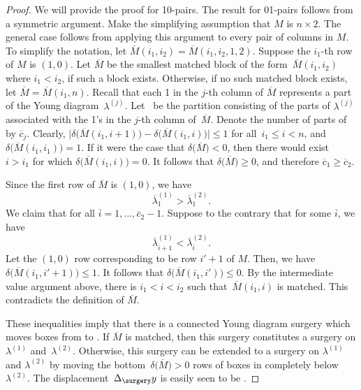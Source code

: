 \begin{proof}
We will provide the proof for 10-pairs. The result for 01-pairs follows from a symmetric argument. Make the simplifying assumption that $M$ is $n\times 2$. The general case follows from applying this argument to every pair of columns in $M$. To simplify the notation, let $\overline{M}(i_1, i_2) = \overline{M}(i_1, i_2, 1, 2)$.
Suppose the $i_1$-th row of $M$ is $(1, 0)$. Let $\overline M$ be the smallest matched block of the form~$\overline{M}(i_1, i_2)$ where $i_1 < i_2$, if such a block exists. Otherwise, if no such matched block exists, let $\overline M = \overline{M}(i_1, n)$. Recall that each 1 in the $j$-th column of $\overline M$ represents a part of the Young diagram~$\lambda^{(j)}$. Let~ be the partition consisting of the parts of $\lambda^{(j)}$ associated with the 1's in the $j$-th column of~$\overline M$. Denote the number of parts of  by $\overline{c}_j$. Clearly, $\big|\delta\bigl(\overline{M}(i_1, i + 1)\bigr) - \delta\bigl(\overline{M}(i_1, i)\bigr)\big| \leq 1$ for all~${i_1 \leq i < n}$, and $\delta\bigl(\overline{M}(i_1, i_1)\bigr) = 1$. If it were the case that $\delta\bigl(\overline M\bigr) < 0$, then there would exist~${i > i_1}$ for which $\delta\bigl(\overline{M}(i_1, i)\bigr) = 0$. It follows that $\delta\bigl(\overline M\bigr) \geq 0$, and therefore $\overline{c}_1 \geq \overline{c}_2$.

Since the first row of $\overline M$ is $(1, 0)$, we have
\[
\overline{\lambda}^{(1)}_1 > \overline{\lambda}^{(2)}_1.
\]
 We claim that  for all $\overline{i}=1, \dots , \overline{c}_2 - 1$. Suppose to the contrary that for some $\overline{i}$, we have
\[
\overline{\lambda}^{(1)}_{\overline{i}+1} < \overline{\lambda}^{(2)}_{\overline{i}}.
\] Let the $(1, 0)$ row corresponding to  be row $i'+1$ of $M$. Then, we have
$\delta\bigl(\overline{M}(i_1, i' + 1)\bigr) \leq 1$. It follows that $\delta\bigl(\overline{M}(i_1, i')\bigr) \leq 0$. By the intermediate value argument above, there is $i_1 < i < i_2$ such that~${\overline{M}(i_1, i)}$ is matched. This contradicts the definition of $\overline M$.

These inequalities imply that there is a connected Young diagram surgery which moves  boxes from  to . If $\overline M$ is matched, then this surgery constitutes a surgery on $\lambda^{(1)}$ and~$\lambda^{(2)}$. Otherwise, this surgery can be extended to a surgery on $\lambda^{(1)}$ and $\lambda^{(2)}$ by moving the bottom~${\delta\bigl(\overline{M}\bigr) >0} $ rows of boxes in  completely below $\lambda^{(2)}$. The displacement~$\Delta_\surgery y$ is easily seen to be .
\end{proof}

